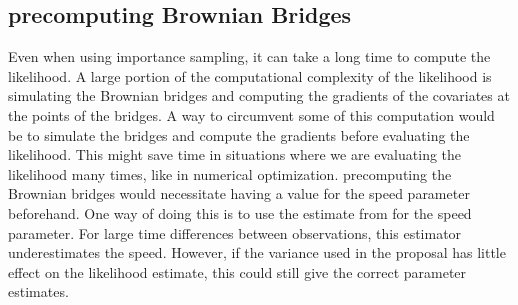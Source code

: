 \subsection{precomputing Brownian Bridges}
\label{subsec: precomputing brownian bridges}
Even when using importance sampling, it can take a long time to compute the likelihood. A large portion of the computational complexity of the likelihood is simulating the Brownian bridges and computing the gradients of the covariates at the points of the bridges. A way to circumvent some of this computation would be to simulate the bridges and compute the gradients before evaluating the likelihood. This might save time in situations where we are evaluating the likelihood many times, like in numerical optimization. precomputing the Brownian bridges would necessitate having a value for the speed parameter beforehand. One way of doing this is to use the estimate from \parencite{michelot_langevin_2019} for the speed parameter. For large time differences between observations, this estimator underestimates the speed. However, if the variance used in the proposal has little effect on the likelihood estimate, this could still give the correct parameter estimates. 













